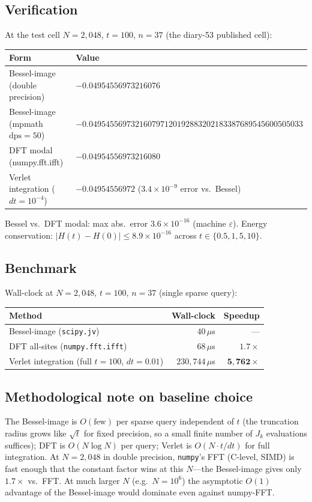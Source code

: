 \documentclass[11pt,reqno]{amsart}
\theoremstyle{definition}
\newcommand{\dps}{\mathrm{dps}}
\begin{document}
\subsection{Verification}
At the test cell $N = 2{,}048$, $t = 100$, $n = 37$ (the diary-53
published cell):

\begin{center}
\begin{tabular}{ll}
\toprule
Form & Value \\
\midrule
Bessel-image (double precision) & $-0.04954556973216076$ \\
Bessel-image (mpmath $\dps = 50$) & $-0.049545569732160797120192883202183387689545600505033$ \\
DFT modal (numpy.fft.ifft) & $-0.04954556973216080$ \\
Verlet integration ($dt = 10^{-4}$) & $-0.04954556972$ ($3.4 \times 10^{-9}$ error vs.\ Bessel) \\
\bottomrule
\end{tabular}
\end{center}

Bessel vs.\ DFT modal: max abs.\ error $3.6 \times 10^{-16}$
(machine $\varepsilon$). Energy conservation: $|H(t) - H(0)|
\le 8.9 \times 10^{-16}$ across $t \in \{0.5, 1, 5, 10\}$.

\subsection{Benchmark}
Wall-clock at $N = 2{,}048$, $t = 100$, $n = 37$ (single sparse query):
\begin{center}
\begin{tabular}{lrr}
\toprule
Method & Wall-clock & Speedup \\
\midrule
Bessel-image (\texttt{scipy.jv}) & $40$\,$\mu$s & --- \\
DFT all-sites (\texttt{numpy.fft.ifft}) & $68$\,$\mu$s & $1.7\times$ \\
Verlet integration (full $t = 100$, $dt = 0.01$) & $230{,}744$\,$\mu$s & $\mathbf{5{,}762\times}$ \\
\bottomrule
\end{tabular}
\end{center}

\subsection{Methodological note on baseline choice}\label{sec:bessel-baseline}
The Bessel-image is $O(\text{few})$ per sparse query independent of
$t$ (the truncation radius grows like $\sqrt{t}$ for fixed precision,
so a small finite number of $J_k$ evaluations suffices); DFT is
$O(N \log N)$ per query; Verlet is $O(N \cdot t/dt)$ for full
integration. At $N = 2{,}048$ in double precision, \texttt{numpy}'s
FFT (C-level, SIMD) is fast enough that the constant factor wins at
this $N$---the Bessel-image gives only $1.7\times$ vs.\ FFT. At much
larger $N$ (e.g.\ $N = 10^6$) the asymptotic $O(1)$ advantage of the
Bessel-image would dominate even against numpy-FFT.
\end{document}
